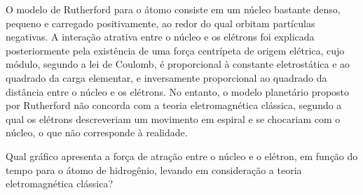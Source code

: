 O modelo de Rutherford para o átomo consiste em um núcleo bastante denso, pequeno e carregado positivamente, ao redor do qual orbitam partículas negativas. A interação atrativa entre o núcleo e os elétrons foi explicada posteriormente pela existência de uma força centrípeta de origem elétrica, cujo módulo, segundo a lei de Coulomb, é proporcional à constante eletrostática e ao quadrado da carga elementar, e inversamente proporcional ao quadrado da distância entre o núcleo e os elétrons. No entanto, o modelo planetário proposto por Rutherford não concorda com a teoria eletromagnética clássica, segundo a qual os elétrons descreveriam um movimento em espiral e se chocariam com o núcleo, o que não corresponde à realidade.\par
{}
Qual gráfico apresenta a força de atração entre o núcleo e o elétron, em função do tempo para o átomo de hidrogênio, levando em consideração a teoria eletromagnética clássica?\par
\begin{center}
\hfill{}\hfill{}\hfill{}\hfill{}
\end{center}
